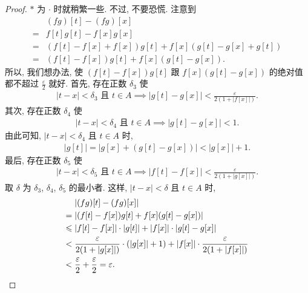 \begin{proof}
    $\ast$ 为 $\cdot$ 时就稍繁一些. 不过, 不要恐慌. 注意到
    \begin{align*}
             & (fg)[t] - (fg)[x]                                   \\
        = {} & f[t]g[t] - f[x]g[x]                                 \\
        = {} & (f[t] - f[x] + f[x])g[t] + f[x](g[t] - g[x] + g[t]) \\
        = {} & (f[t] - f[x])g[t] + f[x](g[t] - g[x]).
    \end{align*}
    所以, 我们想办法, 使 $(f[t] - f[x])g[t]$ 跟 $f[x](g[t] - g[x])$ 的绝对值都不超过 $\frac{\varepsilon}{2}$ 就好. 首先, 存在正数 $\delta_3$ 使
    \begin{align*}
        \text{$|t - x| < \delta_3$ 且 $t \in A$} \implies |g[t] - g[x]| < \frac{\varepsilon}{2(1 + |f[x]|)}.
    \end{align*}
    其次, 存在正数 $\delta_4$ 使
    \begin{align*}
        \text{$|t - x| < \delta_4$ 且 $t \in A$} \implies |g[t] - g[x]| < 1.
    \end{align*}
    由此可知, $|t - x| < \delta_4$ 且 $t \in A$ 时,
    \begin{align*}
        |g[t]| = |g[x] + (g[t] - g[x])| < |g[x]| + 1.
    \end{align*}
    最后, 存在正数 $\delta_5$ 使
    \begin{align*}
        \text{$|t - x| < \delta_5$ 且 $t \in A$} \implies |f[t] - f[x]| < \frac{\varepsilon}{2(1 + |g[x]|)}.
    \end{align*}
    取 $\delta$ 为 $\delta_3$, $\delta_4$, $\delta_5$ 的最小者. 这样, $|t - x| < \delta$ 且 $t \in A$ 时,
    \begin{align*}
                & |(fg)[t] - (fg)[x]|                                                                                   \\
        = {}    & |(f[t] - f[x])g[t] + f[x](g[t] - g[x])|                                                               \\
        \leq {} & |f[t] - f[x]| \cdot |g[t]| + |f[x]| \cdot |g[t] - g[x]|                                               \\
        < {}    & \frac{\varepsilon}{2(1 + |g[x]|)} \cdot (|g[x]| + 1) + |f[x]| \cdot \frac{\varepsilon}{2(1 + |f[x]|)} \\
        < {}    & \frac{\varepsilon}{2} + \frac{\varepsilon}{2} = \varepsilon. \qedhere
    \end{align*}
\end{proof}

